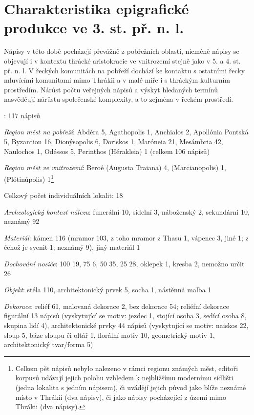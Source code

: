 \section[charakteristika-epigrafické-produkce-ve-3.-st.-př.-n.-l.]{Charakteristika epigrafické produkce ve 3. st. př. n. l.}

Nápisy v této době pocházejí převážně z pobřežních oblastí, nicméně nápisy se objevují i v kontextu thrácké aristokracie ve vnitrozemí stejně jako v 5. a 4. st. př. n. l. V řeckých komunitách na pobřeží dochází ke kontaktu s ostatními řecky mluvícími komunitami mimo Thrákii a v malé míře i s thráckým kulturním prostředím. Nárůst počtu veřejných nápisů a výskyt hledaných termínů nasvědčují nárůstu společenské komplexity, a to zejména v řeckém prostředí.

\placetable[none]{}
\starttable[|l|]
\HL
{}: 117 nápisů

{\em Region měst na pobřeží}: Abdéra 5, Agathopolis 1, Anchialos 2, Apollónia Pontská 5, Byzantion 16, Dionýsopolis 6, Doriskos 1, Maróneia 21, Mesámbria 42, Naulochos 1, Odéssos 5, Perinthos (Hérakleia) 1 (celkem 106 nápisů)

{\em Region měst ve vnitrozemí}: Beroé (Augusta Traiana) 4, (Marcianopolis) 1, (Plótinúpolis) 1\footnote{Celkem pět nápisů nebylo nalezeno v rámci regionu známých měst, editoři korpusů udávají jejich polohu vzhledem k nejbližšímu modernímu sídlišti (jedna lokalita s jedním nápisem), či uvádějí jejich původ jako blíže neznámé místo v Thrákii (dva nápisy), či jako nápisy pocházející z území mimo Thrákii (dva nápisy).}

Celkový počet individuálních lokalit: 18

{\em Archeologický kontext nálezu}: funerální 10, sídelní 3, náboženský 2, sekundární 10, neznámý 92

{\em Materiál}: kámen 116 (mramor 103, z toho mramor z Thasu 1, vápenec 3, jiné 1; z čehož je syenit 1; neznámý 9), jiný materiál 1

{\em Dochování nosiče}: 100  19, 75  6, 50  35, 25  28, oklepek 1, kresba 2, nemožno určit 26

{\em Objekt}: stéla 110, architektonický prvek 5, socha 1, nástěnná malba 1

{\em Dekorace}: reliéf 61, malovaná dekorace 2, bez dekorace 54; reliéfní dekorace figurální 13 nápisů (vyskytující se motiv: jezdec 1, stojící osoba 3, sedící osoba 8, skupina lidí 4), architektonické prvky 44 nápisů (vyskytující se motiv: naiskos 22, sloup 5, báze sloupu či oltář 1, florální motiv 10, geometrický motiv 1, architektonický tvar/forma 5)

